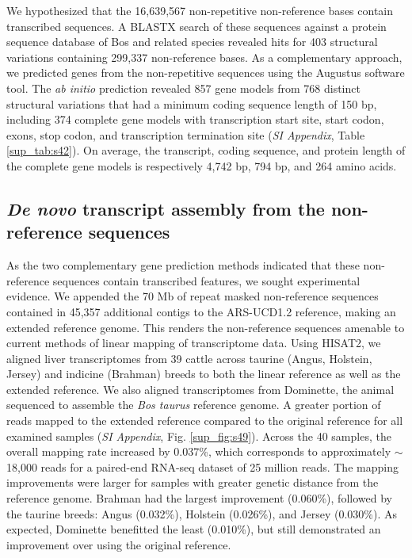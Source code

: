 \documentclass[../main.tex]{subfiles}
\begin{document}
We hypothesized that the 16,639,567 non-repetitive non-reference bases contain transcribed sequences. A BLASTX search of these sequences against a protein sequence database of Bos and related species revealed hits for 403 structural variations containing 299,337 non-reference bases. As a complementary approach, we predicted genes from the non-repetitive sequences using the Augustus software tool. The \emph{ab initio} prediction revealed 857 gene models from 768 distinct structural variations that had a minimum coding sequence length of 150 bp, including 374 complete gene models with transcription start site, start codon, exons, stop codon, and transcription termination site (\emph{SI Appendix}, Table \ref{sup_tab:s42}). On average, the transcript, coding sequence, and protein length of the complete gene models is respectively 4,742 bp, 794 bp, and 264 amino acids. 

\subsection*{\emph{De novo} transcript assembly from the non-reference sequences}

As the two complementary gene prediction methods indicated that these non-reference sequences contain transcribed features, we sought experimental evidence. We appended the 70 Mb of repeat masked non-reference sequences contained in 45,357 additional contigs to the ARS-UCD1.2 reference, making an extended reference genome. This renders the non-reference sequences amenable to current methods of linear mapping of transcriptome data. Using HISAT2, we aligned liver transcriptomes from 39 cattle across taurine (Angus, Holstein, Jersey) and indicine (Brahman) breeds to both the linear reference as well as the extended reference. We also aligned transcriptomes from Dominette, the animal sequenced to assemble the \emph{Bos taurus} reference genome. A greater portion of reads mapped to the extended reference compared to the original reference for all examined samples (\emph{SI Appendix}, Fig. \ref{sup_fig:s49}). Across the 40 samples, the overall mapping rate increased by 0.037\%, which corresponds to approximately $\sim$18,000 reads for a paired-end RNA-seq dataset of 25 million reads. The mapping improvements were larger for samples with greater genetic distance from the reference genome. Brahman had the largest improvement (0.060\%), followed by the taurine breeds: Angus (0.032\%), Holstein (0.026\%), and Jersey (0.030\%). As expected, Dominette benefitted the least (0.010\%), but still demonstrated an improvement over using the original reference. 
\end{document}
